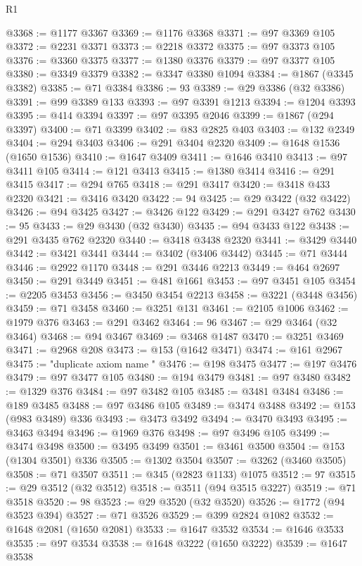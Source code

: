 \begin{lexlean}{R1}
\begin{coremodule}
@3368 := @1177 @3367
@3369 := @1176 @3368
@3371 := @97 @3369 @105
@3372 := @2231 @3371
@3373 := @2218 @3372
@3375 := @97 @3373 @105
@3376 := @3360 @3375
@3377 := @1380 @3376
@3379 := @97 @3377 @105
@3380 := @3349 @3379
@3382 := @3347 @3380 @1094
@3384 := @1867 (@3345 @3382)
@3385 := @71 @3384
@3386 := 93
@3389 := @29 @3386 (@32 @3386)
@3391 := @99 @3389 @133
@3393 := @97 @3391 @1213
@3394 := @1204 @3393
@3395 := @414 @3394
@3397 := @97 @3395 @2046
@3399 := @1867 (@294 @3397)
@3400 := @71 @3399
@3402 := @83 @2825 @403
@3403 := @132 @2349
@3404 := @294 @3403
@3406 := @291 @3404 @2320
@3409 := @1648 @1536 (@1650 @1536)
@3410 := @1647 @3409
@3411 := @1646 @3410
@3413 := @97 @3411 @105
@3414 := @121 @3413
@3415 := @1380 @3414
@3416 := @291 @3415
@3417 := @294 @765
@3418 := @291 @3417
@3420 := @3418 @433 @2320
@3421 := @3416 @3420
@3422 := 94
@3425 := @29 @3422 (@32 @3422)
@3426 := @94 @3425
@3427 := @3426 @122
@3429 := @291 @3427 @762
@3430 := 95
@3433 := @29 @3430 (@32 @3430)
@3435 := @94 @3433 @122
@3438 := @291 @3435 @762 @2320
@3440 := @3418 @3438 @2320
@3441 := @3429 @3440
@3442 := @3421 @3441
@3444 := @3402 (@3406 @3442)
@3445 := @71 @3444
@3446 := @2922 @1170
@3448 := @291 @3446 @2213
@3449 := @464 @2697
@3450 := @291 @3449
@3451 := @481 @1661
@3453 := @97 @3451 @105
@3454 := @2205 @3453
@3456 := @3450 @3454 @2213
@3458 := @3221 (@3448 @3456)
@3459 := @71 @3458
@3460 := @3251 @131
@3461 := @2105 @1006
@3462 := @1979 @376
@3463 := @291 @3462
@3464 := 96
@3467 := @29 @3464 (@32 @3464)
@3468 := @94 @3467
@3469 := @3468 @1487
@3470 := @3251 @3469
@3471 := @2968 @208
@3473 := @153 (@1642 @3471)
@3474 := @161 @2967
@3475 := "duplicate axiom name "
@3476 := @198 @3475
@3477 := @197 @3476
@3479 := @97 @3477 @105
@3480 := @194 @3479
@3481 := @97 @3480
@3482 := @1329 @376
@3484 := @97 @3482 @105
@3485 := @3481 @3484
@3486 := @189 @3485
@3488 := @97 @3486 @105
@3489 := @3474 @3488
@3492 := @153 (@983 @3489) @336
@3493 := @3473 @3492
@3494 := @3470 @3493
@3495 := @3463 @3494
@3496 := @1969 @376
@3498 := @97 @3496 @105
@3499 := @3474 @3498
@3500 := @3495 @3499
@3501 := @3461 @3500
@3504 := @153 (@1304 @3501) @336
@3505 := @1302 @3504
@3507 := @3262 (@3460 @3505)
@3508 := @71 @3507
@3511 := @345 (@2823 @1133) @1075
@3512 := 97
@3515 := @29 @3512 (@32 @3512)
@3518 := @3511 (@94 @3515 @3227)
@3519 := @71 @3518
@3520 := 98
@3523 := @29 @3520 (@32 @3520)
@3526 := @1772 (@94 @3523 @394)
@3527 := @71 @3526
@3529 := @399 @2824 @1082
@3532 := @1648 @2081 (@1650 @2081)
@3533 := @1647 @3532
@3534 := @1646 @3533
@3535 := @97 @3534
@3538 := @1648 @3222 (@1650 @3222)
@3539 := @1647 @3538

\end{coremodule}
\end{lexlean}

